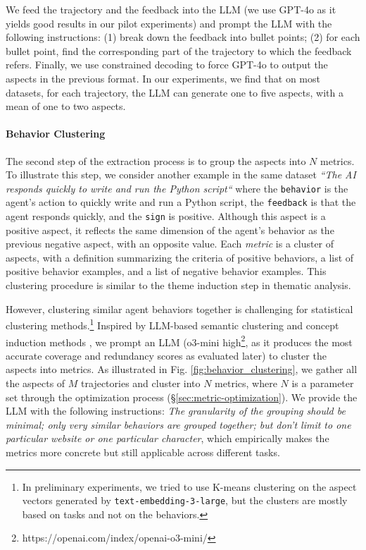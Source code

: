 We feed the trajectory
and the feedback into the LLM (we use GPT-4o \citep{openai2024gpt4ocard} as it yields
good results in our pilot experiments) and prompt the LLM with the following
instructions: (1) break down the feedback into bullet points; (2) for each
bullet point, find the corresponding part of the trajectory to which the feedback
refers. Finally, we use constrained decoding to force GPT-4o to output the aspects
in the previous format. In our experiments, we find that on most datasets, for
each trajectory, the LLM can generate one to five aspects, with a mean of one to
two aspects.

\paragraph{Behavior Clustering}

The second step of the extraction process is to group the aspects into $N$ metrics.
To illustrate this step, we consider another example in the same dataset \textsl{``The
	AI responds quickly to write and run the Python script``} where the \texttt{behavior}
is the agent's action to quickly write and run a Python script, the \texttt{feedback}
is that the agent responds quickly, and the \texttt{sign} is positive. Although
this aspect is a positive aspect, it reflects the same dimension of the agent's behavior
as the previous negative aspect, with an opposite value. Each \emph{metric} is a
cluster of aspects, with a definition summarizing the criteria of positive behaviors,
a list of positive behavior examples, and a list of negative behavior examples.
This clustering procedure is similar to the theme induction step in thematic
analysis.

However, clustering similar agent behaviors together is challenging for statistical
clustering methods.\footnote{ In preliminary experiments, we tried to use K-means
	clustering on the aspect vectors generated by \texttt{text-embedding-3-large},
	but the clusters are mostly based on tasks and not on the behaviors. } Inspired by
LLM-based semantic clustering and concept induction methods \citet{viswanathan2024large,lam2024concept},
we prompt an LLM (o3-mini high\footnote{https://openai.com/index/openai-o3-mini/},
as it produces the most accurate coverage and redundancy scores as evaluated
later) to cluster the aspects into metrics. As illustrated in Fig. \ref{fig:behavior_clustering},
we gather all the aspects of $M$ trajectories and cluster into $N$ metrics, where
$N$ is a parameter set through the optimization process (\S\ref{sec:metric-optimization}).
We provide the LLM with the following instructions: \emph{The granularity of the
	grouping should be minimal; only very similar behaviors are grouped together;
	but don't limit to one particular website or one particular character}, which
empirically makes the metrics more concrete but still applicable across
different tasks.

